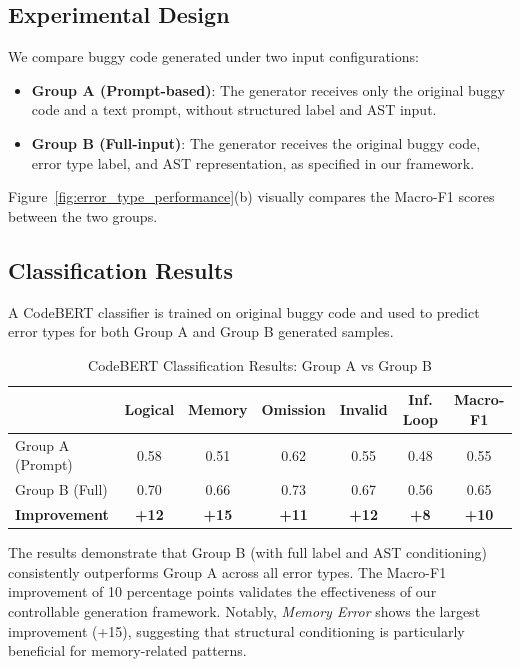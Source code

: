\subsection{Experimental Design}

We compare buggy code generated under two input configurations:

\begin{itemize}
    \item \textbf{Group A (Prompt-based)}: The generator receives only the original buggy code and a text prompt, without structured label and AST input.
    \item \textbf{Group B (Full-input)}: The generator receives the original buggy code, error type label, and AST representation, as specified in our framework.
\end{itemize}

Figure~\ref{fig:error_type_performance}(b) visually compares the Macro-F1 scores between the two groups.

\subsection{Classification Results}

A CodeBERT classifier is trained on original buggy code and used to predict error types for both Group A and Group B generated samples.

\begin{table}[h]
\centering
\caption{CodeBERT Classification Results: Group A vs Group B}
\label{tab:codebert_verification}
\begin{tabular}{lcccccc}
\toprule
 & \textbf{Logical} & \textbf{Memory} & \textbf{Omission} & \textbf{Invalid} & \textbf{Inf. Loop} & \textbf{Macro-F1} \\
\midrule
Group A (Prompt) & 0.58 & 0.51 & 0.62 & 0.55 & 0.48 & 0.55 \\
Group B (Full) & 0.70 & 0.66 & 0.73 & 0.67 & 0.56 & 0.65 \\
\midrule
\textbf{Improvement} & \textbf{+12} & \textbf{+15} & \textbf{+11} & \textbf{+12} & \textbf{+8} & \textbf{+10} \\
\bottomrule
\end{tabular}
\end{table}

The results demonstrate that Group B (with full label and AST conditioning) consistently outperforms Group A across all error types. The Macro-F1 improvement of 10 percentage points validates the effectiveness of our controllable generation framework. Notably, \textit{Memory Error} shows the largest improvement (+15), suggesting that structural conditioning is particularly beneficial for memory-related patterns.

